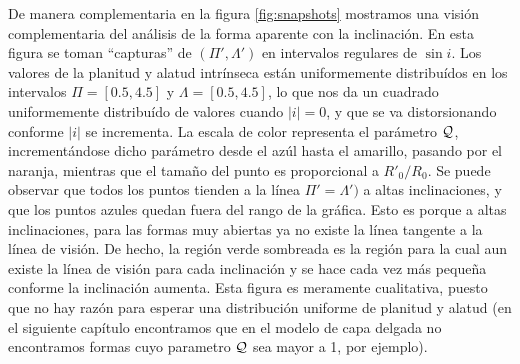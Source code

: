De manera complementaria en la figura \ref{fig:snapshots} mostramos una visión complementaria del análisis de la forma aparente con la inclinación. En esta figura se toman ``capturas'' de $(\Pi', \Lambda')$ en intervalos regulares de $\sin i$. Los valores de la planitud y alatud intrínseca están uniformemente distribuídos en los intervalos $\Pi = [0.5, 4.5]$ y $\Lambda = [0.5, 4.5]$, lo que nos da un cuadrado uniformemente distribuído de valores cuando $|i| = 0$, y que se va distorsionando conforme $|i|$ se incrementa. La escala de color representa el parámetro $\mathcal{Q}$, incrementándose dicho parámetro desde el azúl hasta el amarillo, pasando por el naranja, mientras que el tamaño del punto es proporcional a $R'_0/R_0$. Se puede observar que todos los puntos tienden a la línea $\Pi' = \Lambda')$ a altas inclinaciones, y que los puntos azules quedan fuera del rango de la gráfica. Esto es porque a altas inclinaciones, para las formas muy abiertas ya no existe la línea tangente a la línea de visión. De hecho, la región verde sombreada es la región para la cual aun existe la línea de visión para cada inclinación y se hace cada vez más pequeña conforme la inclinación aumenta. Esta figura es meramente cualitativa, puesto que no hay razón para esperar una distribución uniforme de planitud y alatud (en el siguiente capítulo encontramos que en el modelo de capa delgada no encontramos formas cuyo parametro $\mathcal{Q}$ sea mayor a 1, por ejemplo).

